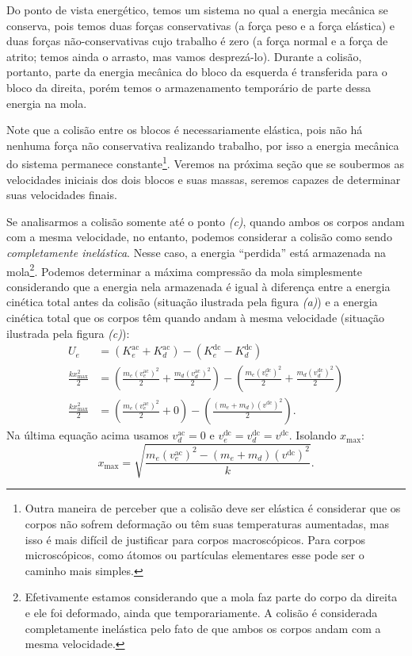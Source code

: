 Do ponto de vista energético, temos um sistema no qual a energia mecânica se conserva, pois temos duas forças conservativas (a força peso e a força elástica) e duas forças não-conservativas cujo trabalho é zero (a força normal e a força de atrito; temos ainda o arrasto, mas vamos desprezá-lo). Durante a colisão, portanto, parte da energia mecânica do bloco da esquerda é transferida para o bloco da direita, porém temos o armazenamento temporário de parte dessa energia na mola.

Note que a colisão entre os blocos é necessariamente elástica, pois não há nenhuma força não conservativa realizando trabalho, por isso a energia mecânica do sistema permanece constante\footnote{Outra maneira de perceber que a colisão deve ser elástica é considerar que os corpos não sofrem deformação ou têm suas temperaturas aumentadas, mas isso é mais difícil de justificar para corpos macroscópicos. Para corpos microscópicos, como átomos ou partículas elementares esse pode ser o caminho mais simples.}. Veremos na próxima seção que se soubermos as velocidades iniciais dos dois blocos e suas massas, seremos capazes de determinar suas velocidades finais.

Se analisarmos a colisão somente até o ponto \emph{(c)}, quando ambos os corpos andam com a mesma velocidade, no entanto, podemos considerar a colisão como sendo \emph{completamente inelástica}. Nesse caso, a energia ``perdida'' está armazenada na mola\footnote{Efetivamente estamos considerando que a mola faz parte do corpo da direita e ele foi deformado, ainda que temporariamente. A colisão é considerada completamente inelástica pelo fato de que ambos os corpos andam com a mesma velocidade.}. Podemos determinar a máxima compressão da mola simplesmente considerando que a energia nela armazenada é igual à diferença entre a energia cinética total antes da colisão (situação ilustrada pela figura \emph{(a)}) e a energia cinética total que os corpos têm quando andam à mesma velocidade (situação ilustrada pela figura \emph{(c)}):
\begin{align}
    U_e &= (K_e^{\text{ac}} + K_d^{\text{ac}}) - (K_e^{\text{dc}} - K_d^{\text{dc}}) \\
    \frac{kx_{\text{max}}^2}{2} &= \left(\frac{m_e(v_e^{\text{ac}})^2}{2} + \frac{m_d(v_d^{\text{ac}})^2}{2}\right) - \left(\frac{m_e(v_e^{\text{dc}})^2}{2} + \frac{m_d(v_d^{\text{dc}})^2}{2}\right) \\
    \frac{kx_{\text{max}}^2}{2} &= \left(\frac{m_e(v_e^{\text{ac}})^2}{2} + 0\right) - \left(\frac{(m_e + m_d)(v^{\text{dc}})^2}{2}\right).
\end{align}
%
Na última equação acima usamos $v_d^{\text{ac}} = 0$ e $v_e^{\text{dc}} = v_d^{\text{dc}} = v^{\text{dc}}$. Isolando $x_{\text{max}}$:
\begin{equation}
    x_{\text{max}} = \sqrt{\frac{m_e(v_e^{\text{ac}})^2 - (m_e + m_d)(v^{\text{dc}})^2}{k}}.
\end{equation}

